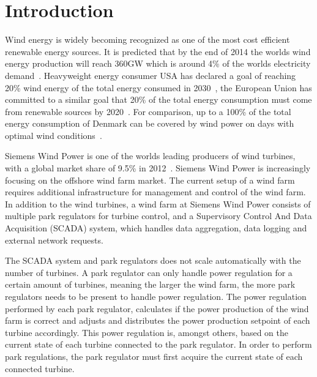 \chapter{Introduction}
\label{chap:intro}

Wind energy is widely becoming recognized as one of the most cost efficient renewable energy sources.
It is predicted that by the end of 2014 the worlds wind energy production will reach 360GW which is around 4\% of the worlds electricity demand~\cite{worldwidewindcapacity}.
Heavyweight energy consumer USA has declared a goal of reaching 20\% wind energy of the total energy consumed in 2030~\cite{20percentenergy}, the European Union has committed to a similar goal that 20\% of the total energy consumption must come from renewable sources by 2020~\cite{directive2009}. For comparison, up to a 100\% of the total energy consumption of Denmark can be covered by wind power on days with optimal wind conditions~\cite{100percentwindenergy}.

Siemens Wind Power is one of the worlds leading producers of wind turbines, with a global market share of 9.5\% in 2012~\cite{worldmarketupdate2012}.
Siemens Wind Power is increasingly focusing on the offshore wind farm market.
The current setup of a wind farm requires additional infrastructure for management and control of the wind farm.
In addition to the wind turbines, a wind farm at Siemens Wind Power consists of multiple park regulators for turbine control, and a Supervisory Control And Data Acquisition (SCADA) system, which handles data aggregation, data logging and external network requests.

The SCADA system and park regulators does not scale automatically with the number of turbines. A park regulator can only handle power regulation for a certain amount of turbines, meaning the larger the wind farm, the more park regulators needs to be present to handle power regulation.
The power regulation performed by each park regulator, calculates if the power production of the wind farm is correct and adjusts and distributes the power production setpoint of each turbine accordingly. This power regulation is, amongst others, based on the current state of each turbine connected to the park regulator. In order to perform park regulations, the park regulator must first acquire the current state of each connected turbine.

